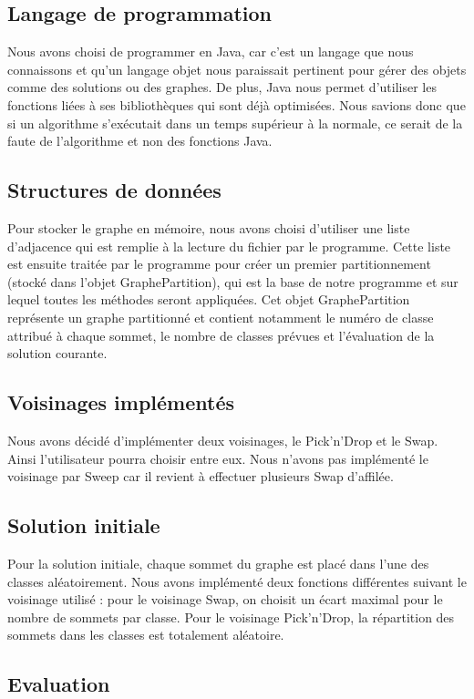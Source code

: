 \documentclass[12pt]{article}
\begin{document}
\subsection{Langage de programmation}
    Nous avons choisi de programmer en Java, car c’est un langage que nous connaissons et qu’un langage objet nous paraissait pertinent pour gérer des objets comme des solutions ou des graphes. De plus, Java nous permet d’utiliser les fonctions liées à ses bibliothèques qui sont déjà optimisées. Nous savions donc que si un algorithme s’exécutait dans un temps supérieur à la normale, ce serait de la faute de l’algorithme et non des fonctions Java.

\subsection{Structures de données}
Pour stocker le graphe en mémoire, nous avons choisi d’utiliser une liste d’adjacence qui est remplie à la lecture du fichier par le programme. Cette liste est ensuite traitée par le programme pour créer un premier partitionnement (stocké dans l’objet GraphePartition), qui est la base de notre programme et sur lequel toutes les méthodes seront appliquées. Cet objet GraphePartition représente un graphe partitionné et contient notamment le numéro de classe attribué à chaque sommet, le nombre de classes prévues et l’évaluation de la solution courante.

\subsection{Voisinages implémentés}
Nous avons décidé d’implémenter deux voisinages, le Pick’n'Drop et le Swap. Ainsi l’utilisateur pourra choisir entre eux.
    Nous n’avons pas implémenté le voisinage par Sweep car il revient à effectuer plusieurs Swap d’affilée.

\subsection{Solution initiale}

Pour la solution initiale, chaque sommet du graphe est placé dans l’une des classes aléatoirement. Nous avons implémenté deux fonctions différentes suivant le voisinage utilisé : pour le voisinage Swap, on choisit un écart maximal pour le nombre de sommets par classe. Pour le voisinage Pick'n'Drop, la répartition des sommets dans les classes est totalement aléatoire.

\subsection{Evaluation}
\end{document}
